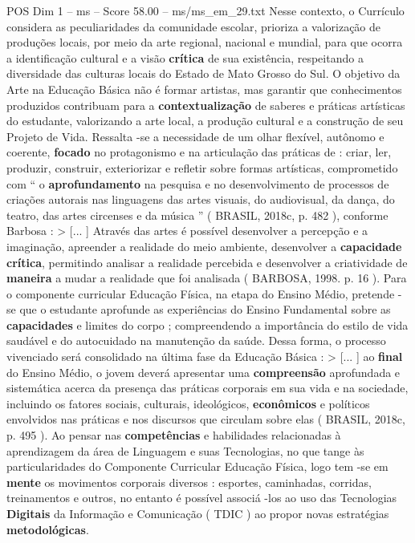 \begin{textsample}{POS Dim 1 – ms – Score 58.00 – ms/ms\_em\_29.txt}
Nesse contexto, o Currículo considera as peculiaridades da comunidade escolar, prioriza a valorização de produções locais, por meio da arte regional, nacional e mundial, para que ocorra a identificação cultural e a visão \textbf{crítica} de sua existência, respeitando a diversidade das culturas locais do Estado de Mato Grosso do Sul.
O objetivo da Arte na Educação Básica não é formar artistas, mas garantir que conhecimentos produzidos contribuam para a \textbf{contextualização} de saberes e práticas artísticas do estudante, valorizando a arte local, a produção cultural e a construção de seu Projeto de Vida.
Ressalta -se a necessidade de um olhar flexível, autônomo e coerente, \textbf{focado} no protagonismo e na articulação das práticas de : criar, ler, produzir, construir, exteriorizar e refletir sobre formas artísticas, comprometido com “ o \textbf{aprofundamento} na pesquisa e no desenvolvimento de processos de criações autorais nas linguagens das artes visuais, do audiovisual, da dança, do teatro, das artes circenses e da música ” ( BRASIL, 2018c, p. 482 ), conforme Barbosa : > [... ] Através das artes é possível desenvolver a percepção e a imaginação, apreender a realidade do meio ambiente, desenvolver a \textbf{capacidade} \textbf{crítica}, permitindo analisar a realidade percebida e desenvolver a criatividade de \textbf{maneira} a mudar a realidade que foi analisada ( BARBOSA, 1998. p. 16 ).
Para o componente curricular Educação Física, na etapa do Ensino Médio, pretende -se que o estudante aprofunde as experiências do Ensino Fundamental sobre as \textbf{capacidades} e limites do corpo ; compreendendo a importância do estilo de vida saudável e do autocuidado na manutenção da saúde.
Dessa forma, o processo vivenciado será consolidado na última fase da Educação Básica : > [... ] ao \textbf{final} do Ensino Médio, o jovem deverá apresentar uma \textbf{compreensão} aprofundada e sistemática acerca da presença das práticas corporais em sua vida e na sociedade, incluindo os fatores sociais, culturais, ideológicos, \textbf{econômicos} e políticos envolvidos nas práticas e nos discursos que circulam sobre elas ( BRASIL, 2018c, p. 495 ).
Ao pensar nas \textbf{competências} e habilidades relacionadas à aprendizagem da área de Linguagem e suas Tecnologias, no que tange às particularidades do Componente Curricular Educação Física, logo tem -se em \textbf{mente} os movimentos corporais diversos : esportes, caminhadas, corridas, treinamentos e outros, no entanto é possível associá -los ao uso das Tecnologias \textbf{Digitais} da Informação e Comunicação ( TDIC ) ao propor novas estratégias \textbf{metodológicas}.

\end{textsample}
